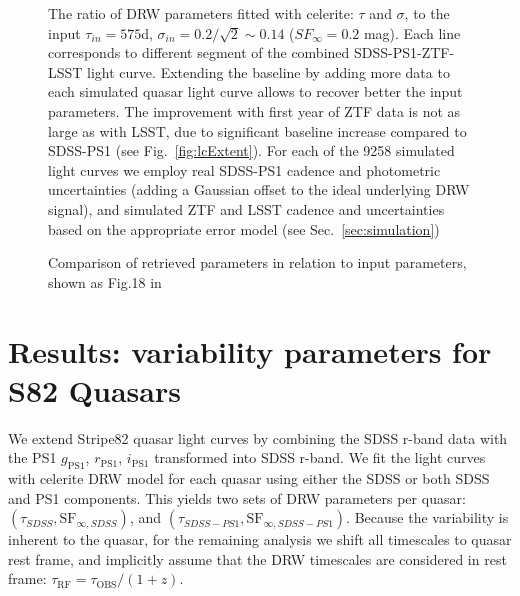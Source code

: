 \documentclass[twocolumn]{aastex62}
\newcommand{\project}[1]{\textsf{#1}}
\begin{document}
\begin{figure*}  %
\caption{The ratio of DRW parameters fitted with \project{celerite}: $\tau$ and $\sigma$, to the input $\tau_{in} = 575 $d, $\sigma_{in} = 0.2 / \sqrt{2} {\sim} 0.14$  ($SF_{\infty}=0.2$ mag).  Each line corresponds to different segment of the combined SDSS-PS1-ZTF-LSST light curve. Extending the baseline by adding more data to each simulated quasar light curve allows to recover better the input parameters. The improvement with first year of ZTF data is not as large as with LSST, due to significant baseline increase compared to SDSS-PS1 (see Fig.~\ref{fig:lcExtent}). For each of the 9258 simulated light curves we employ real SDSS-PS1 cadence and photometric uncertainties (adding a Gaussian offset to the ideal underlying DRW signal), and simulated ZTF and LSST cadence and uncertainties based on the appropriate error model (see Sec.~\ref{sec:simulation})}
\label{fig:simLCresults1}
\end{figure*} 

\begin{figure*} %
\caption{Comparison of retrieved parameters in relation to input parameters, shown as Fig.18 in \citet{macleod2011} }
\label{fig:simLCresults2}
\end{figure*} 


%
%
%
%
%
%
%
%

\section{Results: variability parameters for S82 Quasars}\label{sec:results}

We extend Stripe82 quasar light curves by combining the SDSS r-band data with  the PS1 $g_{\mathrm{PS1}}$, $r_{\mathrm{PS1}}$, $i_{\mathrm{PS1}}$ transformed into SDSS r-band. We fit the light curves with \project{celerite} DRW model for each quasar using either the SDSS or both SDSS and PS1 components. This yields two sets of DRW parameters per quasar: $(\tau_{SDSS}, \mathrm{SF}_{\infty, SDSS})$, and $(\tau_{SDSS-PS1}, \mathrm{SF}_{\infty, SDSS-PS1})$. Because the variability is inherent to the quasar, for the remaining analysis we shift all timescales to quasar rest frame, and implicitly assume that the DRW timescales are considered in rest frame: $\tau_{\mathrm{RF}} = \tau_{\mathrm{OBS}} / (1+z)$.
\end{document}
